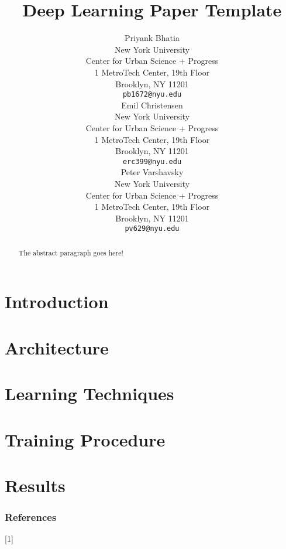 \documentclass{article} %
\title{Deep Learning Paper Template}
\author{
Priyank Bhatia \\
New York University \\
Center for Urban Science + Progress \\
1 MetroTech Center, 19th Floor \\
Brooklyn, NY 11201 \\
\texttt{pb1672@nyu.edu} \\
\AND
Emil Christensen \\
New York University \\
Center for Urban Science + Progress \\
1 MetroTech Center, 19th Floor \\
Brooklyn, NY 11201 \\
\texttt{erc399@nyu.edu} \\
\And
Peter Varshavsky \\
New York University \\
Center for Urban Science + Progress \\
1 MetroTech Center, 19th Floor \\
Brooklyn, NY 11201 \\
\texttt{pv629@nyu.edu} \\
}
\begin{document}
\maketitle


\begin{abstract}
The abstract paragraph goes here!
\end{abstract}

\section{Introduction}
\label{intro}

\section{Architecture}
\label{arc}

\section{Learning Techniques}
\label{learn}

\section{Training Procedure}
\label{train}

\section{Results}
\label{res}


\subsubsection*{References}

\small{
[1] 

}
\end{document}
